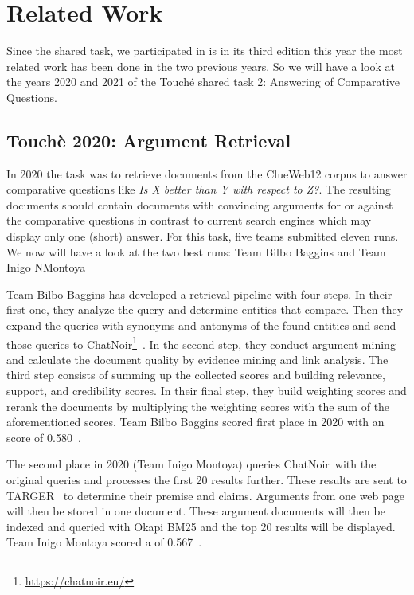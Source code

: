 \section{Related Work}

Since the shared task, we participated in is in its third edition this year the most related work has been done in the two previous years.
So we will have a look at the years 2020 and 2021 of the Touché shared task 2: Answering of Comparative Questions.

\subsection{Touchè 2020: Argument Retrieval}

In 2020 the task was to retrieve documents from the ClueWeb12 corpus to answer comparative questions like \textit{Is X better than Y with respect to Z?}.
The resulting documents should contain documents with convincing arguments for or against the comparative questions in contrast to current search engines which may display only one (short) answer.
For this task, five teams submitted eleven runs.
We now will have a look at the two best runs: Team Bilbo Baggins and Team Inigo NMontoya~\cite{BondarenkoFBGAPBSWPH2020}

Team Bilbo Baggins has developed a retrieval pipeline with four steps.
In their first one, they analyze the query and determine entities that compare.
Then they expand the queries with synonyms and antonyms of the found entities and send those queries to ChatNoir\footnote{\url{https://chatnoir.eu/}}~\todocite.
In the second step, they conduct argument mining and calculate the document quality by evidence mining and link analysis.
The third step consists of summing up the collected scores and building relevance, support, and credibility scores.
In their final step, they build weighting scores and rerank the documents by multiplying the weighting scores with the sum of the aforementioned scores.
Team Bilbo Baggins scored first place in 2020 with an  score of 0.580~\cite{AbyeST2020}.

The second place in 2020 (Team Inigo Montoya) queries ChatNoir~\todocite with the original queries and processes the first 20 results further.
These results are sent to TARGER~\cite{ChernodubOHBHBP2019} to determine their premise and claims.
Arguments from one web page will then be stored in one document.
These argument documents will then be indexed and queried with Okapi BM25 and the top 20 results will be displayed.
Team Inigo Montoya scored a  of 0.567~\cite{Huck2020}.

